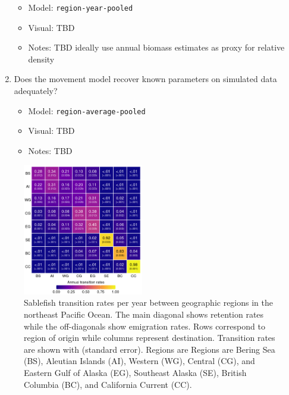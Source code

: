 \documentclass{article}
\begin{document}
\begin{enumerate}
        \begin{itemize}
            \item Model: \texttt{region-year-pooled}
            \item Visual: TBD
            \item Notes: TBD ideally use annual biomass estimates as proxy for relative density
        \end{itemize}    
    \item Does the movement model recover known parameters on simulated data adequately?
        \begin{itemize}
            \item Model: \texttt{region-average-pooled}
            \item Visual: TBD
            \item Notes: TBD
        \end{itemize}
\end{enumerate}

\begin{figure}[htb]
    \centering
    \includegraphics[width = 0.47\textwidth]{heat-region-average-pooled}
    \caption{Sablefish transition rates per year between geographic regions in the northeast Pacific Ocean. The main diagonal shows retention rates while the off-diagonals show emigration rates. Rows correspond to region of origin while columns represent destination. Transition rates are shown with (standard error). Regions are Regions are Bering Sea (BS), Aleutian Islands (AI), Western (WG), Central (CG), and Eastern Gulf of Alaska (EG), Southeast Alaska (SE), British Columbia (BC), and California Current (CC).}
    \label{fig:heat-region-average-pooled}
\end{figure}
\end{document}
